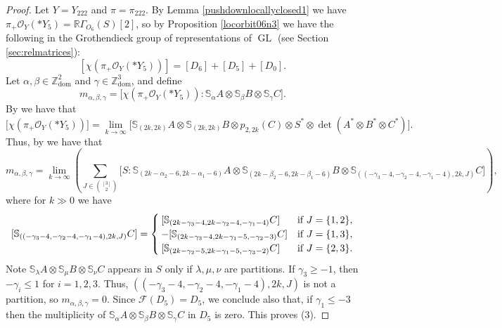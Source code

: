 \documentclass[11pt,reqno]{amsart}
\newcommand{\oo}{\otimes}
\newcommand{\bS}{\mathbb{S}}
\newcommand{\tn}{\textnormal}
\newcommand{\GL}{\operatorname{GL}}
\renewcommand{\det}{\operatorname{det}}
\newcommand{\dom}{\operatorname{dom}}
\newcommand{\mc}[1]{\mathcal{#1}}
\numberwithin{equation}{section}
\begin{document}
\begin{proof}
Let $Y=Y_{222}$ and $\pi=\pi_{222}$. By Lemma \ref{pushdownlocallyclosed1} we have $\pi_{+}\mc{O}_Y(\ast Y_5)=\mathbb{R}\Gamma_{O_6}(S)[2]$, so by Proposition \ref{locorbit06n3} we have the following in the Grothendieck group of representations of $\GL$ (see Section \ref{sec:relmatrices}):
\begin{equation}\label{eqn:gglco6n3}
[\chi(\pi_{+}\mc{O}_Y(\ast Y_5))]=[D_6]+[D_5]+[D_0].
\end{equation}
Let $\alpha,\beta\in \mathbb{Z}^2_{\dom}$ and $\gamma \in \mathbb{Z}^3_{\dom}$, and define 
$$
m_{\alpha,\beta,\gamma}=\big[ \chi(\pi_+ \mc{O}_Y(\ast Y_5)):\bS_{\alpha}A\oo \bS_{\beta}B \oo \bS_{\gamma}C\big].
$$
By \cite[Lemma 2.5, Proposition 2.10]{raicu2016characters} we have that 
$$
\big[\chi(\pi_+ \mc{O}_Y(\ast Y_5))\big]=\lim_{k\to \infty} \big[\bS_{(2k,2k)}A\oo \bS_{(2k,2k)}B\oo p_{2,2k}(C)\oo 
 S^{\ast}\otimes \det(A^{\ast}\oo B^{\ast}\oo C^{\ast})\big].
$$
Thus, by \cite[Lemma 2.3]{raicu2016characters} we have that
$$
m_{\alpha,\beta,\gamma}=\lim_{k\to \infty}\left(\sum_{J\in \binom{[3]}{2}}\big[S:\bS_{(2k-\alpha_2-6,2k-\alpha_1-6)}A\oo \bS_{(2k-\beta_2-6,2k-\beta_1-6)}B \oo \bS_{((-\gamma_3-4,-\gamma_2-4,-\gamma_1-4),2k,J)}C \big]\right),
$$
where for $k\gg0$ we have
$$
[\bS_{((-\gamma_3-4,-\gamma_2-4,-\gamma_1-4),2k,J)}C]=\begin{cases}
[\bS_{(2k-\gamma_3-4,2k-\gamma_2-4,-\gamma_1-4)}C] & \tn{if }J=\{1,2\},\\
-[\bS_{(2k-\gamma_3-4,2k-\gamma_1-5,-\gamma_2-3)}C] & \tn{if }J=\{1,3\},\\
[\bS_{(2k-\gamma_2-5,2k-\gamma_1-5,-\gamma_3-2)}C] & \tn{if }J=\{2,3\}.	
\end{cases}
$$
Note $\bS_{\lambda}A\oo \bS_{\mu}B\oo \bS_{\nu}C$ appears in $S$ only if $\lambda,\mu,\nu$ are partitions. If $\gamma_3\geq -1$, then $-\gamma_i\leq 1$ for $i=1,2,3$. Thus, $((-\gamma_3-4,-\gamma_2-4,-\gamma_1-4),2k,J)$ is not a partition, so $m_{\alpha,\beta,\gamma}=0$. Since $\mc{F}(D_5)=D_5$, we conclude also that, if $\gamma_1\leq -3$ then the multiplicity of $\bS_{\alpha}A\oo \bS_{\beta}B \oo \bS_{\gamma}C$ in $D_5$ is zero. This proves (3).









\end{proof}
\end{document}
